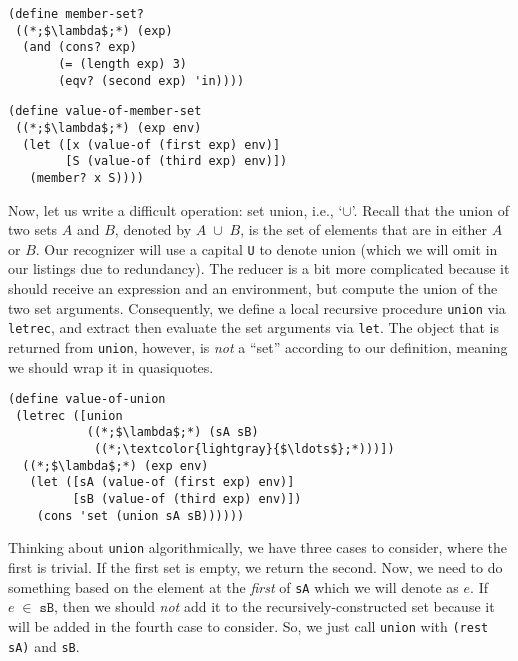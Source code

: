 \begin{clrr}[]{}
\begin{lstlisting}[language=MyScheme]
(define member-set?
 ((*;$\lambda$;*) (exp)
  (and (cons? exp)
       (= (length exp) 3)
       (eqv? (second exp) 'in))))
\end{lstlisting}
\tcblower
\begin{lstlisting}[language=MyNLNScheme]
(define value-of-member-set
 ((*;$\lambda$;*) (exp env)
  (let ([x (value-of (first exp) env)]
        [S (value-of (third exp) env)])
   (member? x S))))
\end{lstlisting}
\end{clrr}

Now, let us write a difficult operation: set union, i.e., `$\cup$'. Recall that the union of two sets $A$ and $B$, denoted by $A\;\cup\;B$, is the set of elements that are in either $A$ or $B$. Our recognizer will use a capital \texttt{U} to denote union (which we will omit in our listings due to redundancy). The reducer is a bit more complicated because it should receive an expression and an environment, but compute the union of the two set arguments. Consequently, we define a local recursive procedure \texttt{union} via \texttt{letrec}, and extract then evaluate the set arguments via \texttt{let}. The object that is returned from \texttt{union}, however, is \textit{not} a ``set'' according to our definition, meaning we should wrap it in quasiquotes.

\begin{cl}[]{}
\begin{lstlisting}[language=MyScheme]
(define value-of-union
 (letrec ([union 
           ((*;$\lambda$;*) (sA sB)
            ((*;\textcolor{lightgray}{$\ldots$};*)))])
  ((*;$\lambda$;*) (exp env)
   (let ([sA (value-of (first exp) env)]
         [sB (value-of (third exp) env)])
    (cons 'set (union sA sB))))))
\end{lstlisting}
\end{cl}

Thinking about \texttt{union} algorithmically, we have three cases to consider, where the first is trivial. If the first set is empty, we return the second.
Now, we need to do something based on the element at the \textit{first} of \texttt{sA} which we will denote as $e$. If $e\;\in\;\texttt{sB}$, then we should \textit{not} add it to the recursively-constructed set because it will be added in the fourth case to consider. So, we just call \texttt{union} with \texttt{(rest sA)} and \texttt{sB}.


